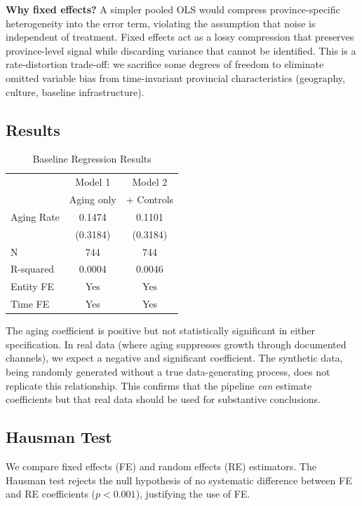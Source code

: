 \documentclass[12pt]{article}
\begin{document}
\textbf{Why fixed effects?} A simpler pooled OLS would compress province-specific heterogeneity into the error term, violating the assumption that noise is independent of treatment. Fixed effects act as a lossy compression that preserves province-level signal while discarding variance that cannot be identified. This is a rate-distortion trade-off: we sacrifice some degrees of freedom to eliminate omitted variable bias from time-invariant provincial characteristics (geography, culture, baseline infrastructure).

\subsection{Results}

\begin{table}[htbp]
\centering
\caption{Baseline Regression Results}
\begin{tabular}{lcc}
\toprule
& Model 1 & Model 2 \\
& Aging only & + Controls \\
\midrule
Aging Rate & 0.1474 & 0.1101 \\
& (0.3184) & (0.3184) \\
N & 744 & 744 \\
R-squared & 0.0004 & 0.0046 \\
Entity FE & Yes & Yes \\
Time FE & Yes & Yes \\
\bottomrule
\end{tabular}
\end{table}

The aging coefficient is positive but not statistically significant in either specification. In real data (where aging suppresses growth through documented channels), we expect a negative and significant coefficient. The synthetic data, being randomly generated without a true data-generating process, does not replicate this relationship. This confirms that the pipeline \textit{can} estimate coefficients but that real data should be used for substantive conclusions.

\subsection{Hausman Test}

We compare fixed effects (FE) and random effects (RE) estimators. The Hausman test rejects the null hypothesis of no systematic difference between FE and RE coefficients ($p < 0.001$), justifying the use of FE.
\end{document}
